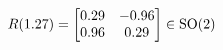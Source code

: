 \documentclass[preview]{standalone}
\begin{document}
\begin{align*}
\special{dvisvgm:raw <g id='unique000'>}R(1.27) = \begin{bmatrix} 0.29 & -0.96 \\ 0.96 & 0.29 \end{bmatrix} \in \text{SO}(2)\special{dvisvgm:raw </g>}
\end{align*}
\end{document}
